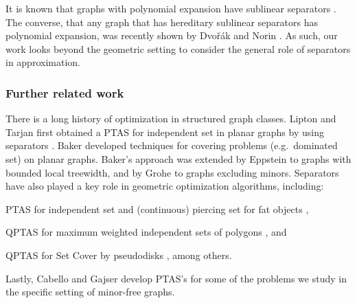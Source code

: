 \documentclass[12pt]{article}
\newcommand{\Term}[1]{\textsf{#1}}
\theoremstyle{remark}\theoremheaderfont{\sf}\theorembodyfont{\upshape}
\numberwithin{figure}{section}\numberwithin{table}{section}\numberwithin{equation}{section}
\newcommand{\ProblemC}[1]{\textsf{#1}}
\newcommand{\PTAS}{\Term{PTAS}\xspace}
\newcommand{\QPTAS}{\Term{QPTAS}\xspace}
\begin{document}
It is known that graphs with polynomial expansion have sublinear
separators \cite{no-gcbe1-08}. The converse, that any graph that has
hereditary sublinear separators has polynomial expansion, was recently
shown by Dvo{\v{r}}{\'{a}}k and Norin \cite{dn-ssspe-15}. As such, our
work looks beyond the geometric setting to consider the general role
of separators in approximation.


\subsubsection{Further related work}

There is a long history of optimization in structured graph
classes. Lipton and Tarjan first obtained a \PTAS for independent set
in planar graphs by using separators
\cite{lt-stpg-79,lt-apst-80}. Baker \cite{b-aancp-94} developed
techniques for covering problems (e.g.\ dominated set) on planar
graphs. Baker's approach was extended by Eppstein \cite{e-dtmcg-00} to
graphs with bounded local treewidth, and by Grohe \cite{g-ltwem-03} to
graphs excluding minors. Separators have also played a key role in
geometric optimization algorithms, including:
\begin{inparaenum}[(i)]
\item \PTAS for independent set and (continuous) piercing set for fat
  objects \cite{c-ptasp-03, mr-irghs-10},
\item \QPTAS for maximum weighted independent sets of polygons
  \cite{aw-asmwi-13,aw-qmwis-14,h-qssp-14}, and
\item \QPTAS for \ProblemC{Set Cover} by pseudodisks
  \cite{mrr-qgscp-14}, among others.
\end{inparaenum}
Lastly, Cabello and Gajser \cite{cg-spfgem-14} develop \PTAS{}'s for
some of the problems we study in the specific setting of minor-free
graphs.
\end{document}
